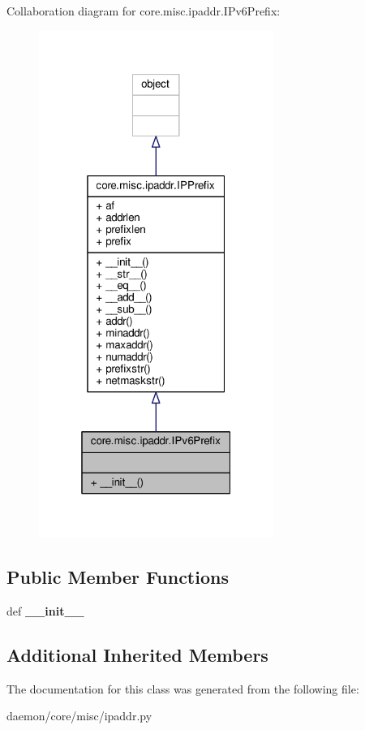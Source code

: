 Collaboration diagram for core.\+misc.\+ipaddr.\+I\+Pv6\+Prefix\+:
\nopagebreak
\begin{figure}[H]
\begin{center}
\leavevmode
\includegraphics[width=217pt]{classcore_1_1misc_1_1ipaddr_1_1_i_pv6_prefix__coll__graph}
\end{center}
\end{figure}
\subsection*{Public Member Functions}
\begin{DoxyCompactItemize}
\item 
\hypertarget{classcore_1_1misc_1_1ipaddr_1_1_i_pv6_prefix_a25b0cabb65af3fa6505754160df95abe}{def {\bfseries \+\_\+\+\_\+init\+\_\+\+\_\+}}\label{classcore_1_1misc_1_1ipaddr_1_1_i_pv6_prefix_a25b0cabb65af3fa6505754160df95abe}

\end{DoxyCompactItemize}
\subsection*{Additional Inherited Members}


The documentation for this class was generated from the following file\+:\begin{DoxyCompactItemize}
\item 
daemon/core/misc/ipaddr.\+py\end{DoxyCompactItemize}
